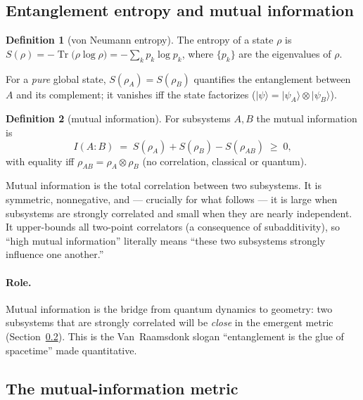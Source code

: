 \documentclass[11pt]{article}
\DeclareMathOperator{\Tr}{Tr}
\newcommand{\ket}[1]{\lvert #1 \rangle}
\theoremstyle{definition}
\newtheorem{definition}{Definition}[section]
\theoremstyle{plain}
\begin{document}
\subsection{Entanglement entropy and mutual information}
\label{sec:mi}

\begin{definition}[von Neumann entropy]
The entropy of a state $\rho$ is $S(\rho) = -\Tr\big(\rho\log\rho\big)
= -\sum_k p_k \log p_k$, where $\{p_k\}$ are the eigenvalues of $\rho$.
\end{definition}

For a \emph{pure} global state, $S(\rho_A)=S(\rho_B)$ quantifies the entanglement between
$A$ and its complement; it vanishes iff the state factorizes ($\ket{\psi}=\ket{\psi_A}\otimes\ket{\psi_B}$).

\begin{definition}[mutual information]
For subsystems $A,B$ the mutual information is
\begin{equation}
I(A:B)\;=\;S(\rho_A)+S(\rho_B)-S(\rho_{AB})\;\ge\;0,
\end{equation}
with equality iff $\rho_{AB}=\rho_A\otimes\rho_B$ (no correlation, classical or quantum).
\end{definition}

Mutual information is the total correlation between two subsystems. It is symmetric,
nonnegative, and --- crucially for what follows --- it is large when subsystems are
strongly correlated and small when they are nearly independent. It upper-bounds all
two-point correlators (a consequence of subadditivity), so ``high mutual information''
literally means ``these two subsystems strongly influence one another.''

\paragraph{Role.} Mutual information is the bridge from quantum dynamics to geometry: two
subsystems that are strongly correlated will be \emph{close} in the emergent metric
(Section~\ref{sec:metric}). This is the Van~Raamsdonk slogan ``entanglement is the glue of
spacetime'' \cite{vanraamsdonk2010} made quantitative.

\subsection{The mutual-information metric}
\label{sec:metric}
\end{document}
